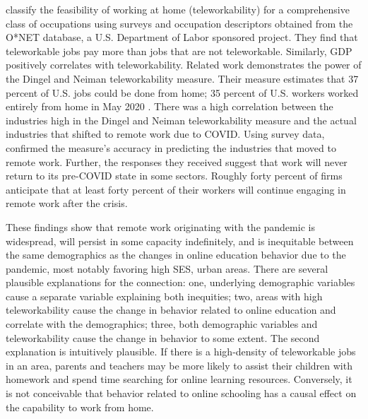 \cite{dingel} classify the feasibility of working at home (teleworkability) for a comprehensive class of occupations using surveys and occupation descriptors obtained from the O*NET database, a U.S. Department of Labor sponsored project.
They find that teleworkable jobs pay more than jobs that are not teleworkable.
Similarly, GDP positively correlates with teleworkability.
Related work demonstrates the power of the Dingel and Neiman teleworkability measure.
Their measure estimates that 37 percent of U.S. jobs could be done from home; 35 percent of U.S. workers worked entirely from home in May 2020 \citep{blandin}.
There was a high correlation between the industries high in the Dingel and Neiman teleworkability measure and the actual industries that shifted to remote work due to COVID.
Using survey data, \cite{bartik} confirmed the measure’s accuracy in predicting the industries that moved to remote work.
Further, the responses they received suggest that work will never return to its pre-COVID state in some sectors.
Roughly forty percent of firms anticipate that at least forty percent of their workers will continue engaging in remote work after the crisis.

These findings show that remote work originating with the pandemic is widespread, will persist in some capacity indefinitely, and is inequitable between the same demographics as the changes in online education behavior due to the pandemic, most notably favoring high SES, urban areas.
There are several plausible explanations for the connection: one, underlying demographic variables cause a separate variable explaining both inequities; two, areas with high teleworkability cause the change in behavior related to online education and correlate with the demographics; three, both demographic variables and teleworkability cause the change in behavior to some extent.
The second explanation is intuitively plausible.
If there is a high-density of teleworkable jobs in an area, parents and teachers may be more likely to assist their children with homework and spend time searching for online learning resources.
Conversely, it is not conceivable that behavior related to online schooling has a causal effect on the capability to work from home.

